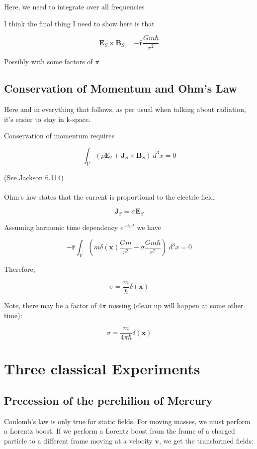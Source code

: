 \documentclass {article}
\renewcommand\vec{\mathbf}
\let\OldHat\hat
\renewcommand{\hat}[1]{\OldHat{\mathbf{#1}}}
\begin{document}
Here, we need to integrate over all frequencies

I think the final thing I need to show here is that

$$\vec E_S \times \vec B_S = - \hat r \frac {Gm \hbar} {r^2}$$

Possibly with some factors of $\pi$

\newpage

\subsection {Conservation of Momentum and Ohm's Law}

Here and in everything that follows, as per usual when talking about radiation, it's easier to stay in k-space.

Conservation of momentum requires

$$\int_V \left(  \rho \vec E_I  + \vec J_S \times \vec B_S \right) ~ d^3x  = 0 $$

(See Jackson 6.114)
\\
\\

Ohm's law states that the current is proportional to the electric field:

$$\vec J_S = \sigma \vec E_S$$ 

Assuming harmonic time dependency $e^{-iwt}$ we have

$$- \hat r \int_V \left(  m \delta (\vec x) \frac {Gm}{r^2}  - \sigma \frac {Gm \hbar} {r^2} \right) ~ d^3x  = 0 $$

Therefore,

$$\sigma = \frac m \hbar \delta (\vec x) $$

Note, there may be a factor of $4 \pi $ missing (clean up will happen at some other time):

$$\sigma = \frac m {4 \pi \hbar} \delta (\vec x) $$


\newpage

\section{Three classical Experiments}
\subsection{Precession of the perehilion of Mercury}


Coulomb's law is only true for static fields. For moving masses, we must perform a Lorentz boost. If we perform a  Lorentz boost from the frame of a charged particle to a different frame moving at a velocity $\vec v$, we get the transformed fields:
\end{document}
